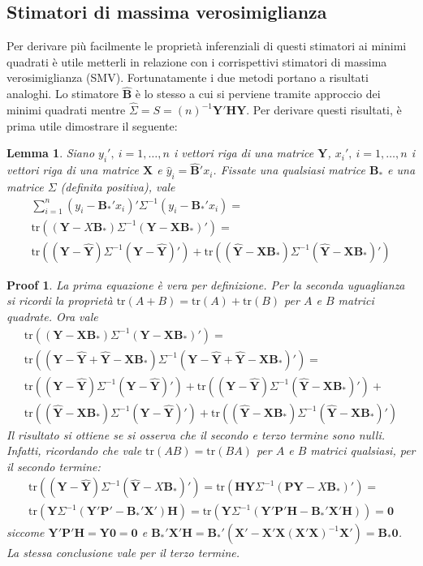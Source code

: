 \documentclass[10pt]{article}
\newtheorem{lem}[thm]{Lemma}
\newtheorem{prf}[thm]{Proof}
\newcommand{\bfB}{\mathbf{B}}
\newcommand{\HH}{\mathbf{H}}
\newcommand{\PP}{\mathbf{P}}
\newcommand{\tr}{\mathrm{tr}}
\newcommand{\XX}{\mathbf{X}}
\newcommand{\YY}{\mathbf{Y}}
\newcommand{\zeros}{\mathbf{0}}
\begin{document}
\subsection{Stimatori di massima verosimiglianza}
Per derivare più facilmente le proprietà inferenziali di questi stimatori ai minimi quadrati
è utile metterli in relazione con i corrispettivi stimatori di massima verosimiglianza (SMV). 
Fortunatamente i due metodi portano a risultati analoghi.
Lo stimatore $\hat{\bfB}$ è lo stesso a cui si perviene tramite approccio dei minimi quadrati mentre $\hat{\Sigma}=S=(n)^{-1}\YY'\HH\YY$.
Per derivare questi risultati, è prima utile dimostrare il seguente:
\begin{lem}\label{decoScarti}
Siano $y_i',\ i=1,\ldots,n$ i vettori riga di una matrice $\YY$, $x_i',\ i=1,\ldots,n$ i vettori riga di una matrice $\XX$  e ${\hat y}_i=\hat{\bfB}'x_i$. Fissate una qualsiasi matrice $\bfB_*$ e una matrice $\Sigma$ (definita positiva), vale
\begin{eqnarray*}
\sum_{i=1}^n (y_i-\bfB_*' x_i)'\Sigma^{-1}(y_i-\bfB_*' x_i)=\\
\tr\left( (\YY-X\bfB_*)\Sigma^{-1}(\YY-\XX\bfB_*)' \right)=\\
\tr \left( (\YY-\hat{\YY})\Sigma^{-1}(\YY-\hat{\YY})' \right) + \tr\left( (\hat{\YY}-\XX\bfB_*)\Sigma^{-1}(\hat{\YY}-\XX\bfB_*)' 
\right)
\end{eqnarray*}
\end{lem}

\begin{prf}
La prima equazione è vera per definizione.
Per la seconda uguaglianza si ricordi la proprietà $\tr(A+B)=\tr(A)+\tr(B)$ per $A$ e $B$ matrici quadrate. Ora vale
\begin{eqnarray*}
\tr\left((\YY-\XX\bfB_*)\Sigma^{-1}(\YY-\XX\bfB_*)'\right) =\\
\tr\left((\YY-\hat{\YY}+\hat{\YY}-\XX\bfB_*)\Sigma^{-1}(\YY-\hat{\YY}+\hat{\YY}-\XX\bfB_*)' \right)=\\
\tr\left((\YY-\hat{\YY})\Sigma^{-1}(\YY-\hat{\YY})'\right) +\tr\left((\YY-\hat{\YY})\Sigma^{-1}(\hat{\YY}-\XX\bfB_*)'\right)+\\
\tr\left((\hat{\YY}-\XX\bfB_*)\Sigma^{-1}(\YY-\hat{\YY})'\right) + \tr\left((\hat{\YY}-\XX\bfB_*)\Sigma^{-1}(\hat{\YY}-\XX\bfB_*)'\right)
\end{eqnarray*}
Il risultato si ottiene se si osserva che il secondo e terzo termine sono nulli. Infatti, 
ricordando che vale $\tr(AB)=\tr(BA)$ per $A$ e $B$ matrici qualsiasi, per il secondo termine:
\begin{eqnarray*}
\tr\left((\YY-\hat{\YY})\Sigma^{-1}(\hat{\YY}-X\bfB_*)'\right)=\tr\left(\HH \YY\Sigma^{-1}(\PP\YY-X\bfB_*)'\right)=\\
\tr\left(\YY\Sigma^{-1}(\YY'\PP'-\bfB_*'\XX')\HH \right)=\tr\left(\YY\Sigma^{-1}(\YY'\PP'\HH-\bfB_*'\XX'\HH) \right)=\zeros
\end{eqnarray*}
siccome $\YY' \PP'\HH = \YY \zeros=\zeros$ e $\bfB_*'\XX'\HH = \bfB_*'(\XX' - \XX'\XX (\XX'\XX)^{-1} \XX')=\bfB_* \zeros$.
La stessa conclusione vale per il terzo termine.
\end{prf}
\end{document}
